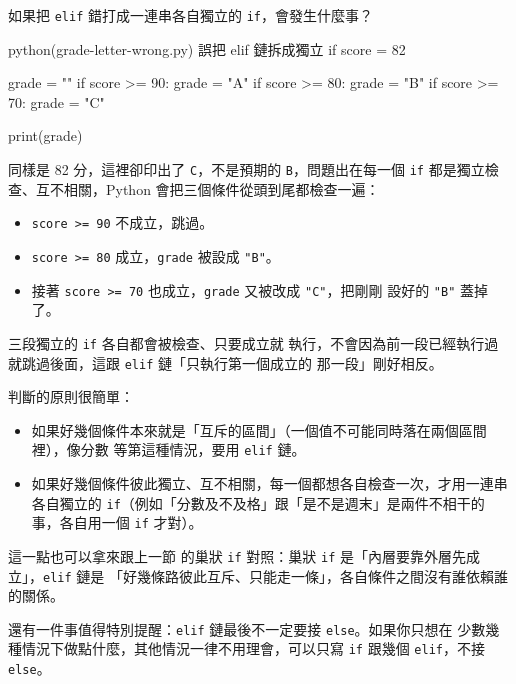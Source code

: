 
如果把 \texttt{elif} 錯打成一連串各自獨立的 \texttt{if}，會發生什麼事？

\begin{example}{python}{(grade-letter-wrong.py) 誤把 elif 鏈拆成獨立 if}
score = 82

grade = ""
if score >= 90:
    grade = "A"
if score >= 80:
    grade = "B"
if score >= 70:
    grade = "C"

print(grade)
\end{example}


同樣是 82 分，這裡卻印出了 \texttt{C}，不是預期的 \texttt{B}，問題出在每一個
\texttt{if} 都是獨立檢查、互不相關，Python 會把三個條件從頭到尾都檢查一遍：
\begin{itemize}
\item \texttt{score >= 90} 不成立，跳過。
\item \texttt{score >= 80} 成立，\texttt{grade} 被設成 \texttt{"B"}。
\item 接著 \texttt{score >= 70} 也成立，\texttt{grade} 又被改成 \texttt{"C"}，把剛剛
設好的 \texttt{"B"} 蓋掉了。
\end{itemize}

三段獨立的 \texttt{if} 各自都會被檢查、只要成立就
執行，不會因為前一段已經執行過就跳過後面，這跟 \texttt{elif} 鏈「只執行第一個成立的
那一段」剛好相反。

判斷的原則很簡單：
\begin{itemize}
\item 如果好幾個條件本來就是「互斥的區間」（一個值不可能同時落在兩個區間裡），像分數
等第這種情況，要用 \texttt{elif} 鏈。
\item 如果好幾個條件彼此獨立、互不相關，每一個都想各自檢查一次，才用一連串各自獨立的
\texttt{if}（例如「分數及不及格」跟「是不是週末」是兩件不相干的事，各自用一個
\texttt{if} 才對）。
\end{itemize}

這一點也可以拿來跟上一節
的巢狀 \texttt{if} 對照：巢狀 \texttt{if} 是「內層要靠外層先成立」，\texttt{elif} 鏈是
「好幾條路彼此互斥、只能走一條」，各自條件之間沒有誰依賴誰的關係。

還有一件事值得特別提醒：\texttt{elif} 鏈最後不一定要接 \texttt{else}。如果你只想在
少數幾種情況下做點什麼，其他情況一律不用理會，可以只寫 \texttt{if} 跟幾個
\texttt{elif}，不接 \texttt{else}。

